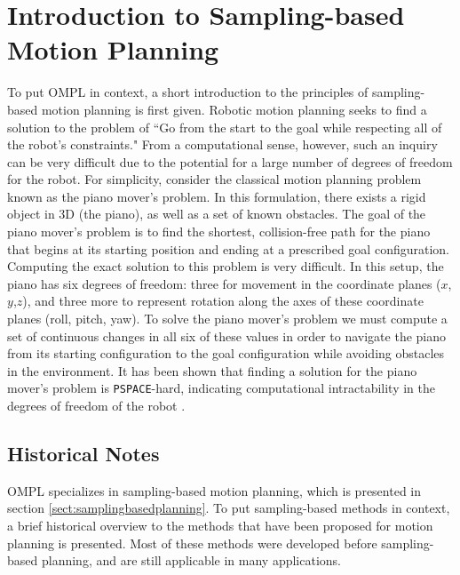 \chapter{Introduction to Sampling-based Motion Planning}
\label{chp:motionplanning}

To put OMPL in context, a short introduction to the principles of 
sampling-based motion planning is first given.  Robotic motion planning seeks
to find a solution to the problem of ``Go from the start to the goal while 
respecting all of the robot's constraints."  From a computational sense, 
however, such an inquiry can be very difficult due to the potential for a large
number of degrees of freedom for the robot.  For simplicity, consider the 
classical motion planning problem known as the piano mover's problem.  In this
formulation, there exists a rigid object in 3D (the piano), as well as a set of
known obstacles.  The goal of the piano mover's problem is to find the shortest,
collision-free path for the piano that begins at its starting position and 
ending at a prescribed goal configuration.  Computing the exact solution to 
this problem is very difficult.  In this setup, the piano has six degrees of 
freedom: three for movement in the coordinate planes ($x$,$y$,$z$), and three 
more to represent rotation along the axes of these coordinate planes (roll, 
pitch, yaw).  To solve the piano mover's problem we must compute a set of 
continuous changes in all six of these values in order to navigate the piano 
from its starting configuration to the goal configuration while avoiding 
obstacles in the environment.  It has been shown that finding a solution for 
the piano mover's problem is {\tt PSPACE}-hard, indicating computational 
intractability in the degrees of freedom of the robot \cite{Latombe:1991,
Choset:2005, LaValle:2006}.

\section {Historical Notes}
OMPL specializes in sampling-based motion planning, which is presented in
section \ref {sect:samplingbasedplanning}.  To put sampling-based methods
in context, a brief historical overview to the methods that have been proposed
for motion planning is presented.  Most of these methods were developed before
sampling-based planning, and are still applicable in many applications.  


